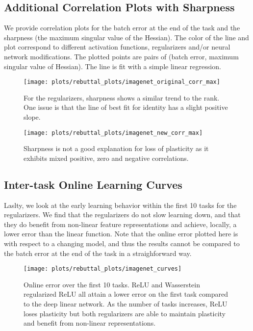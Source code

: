 \newpage
\subsection{Additional Correlation Plots with Sharpness}
We provide correlation plots for the batch error at the end of the task and the sharpness (the maximum singular value of the Hessian).
The color of the line and plot correspond to different activation functions, regularizers and/or neural network modifications.
The plotted points are pairs of (batch error, maximum singular value of Hessian).
The line is fit with a simple linear regression.

\begin{figure}[h!]
  \centering
  \texttt{[image: plots/rebuttal\_plots/imagenet\_original\_corr\_max]}
  \caption{
      For the regularizers, sharpness shows a similar trend to the rank. One issue is that the line of best fit for identity has a slight positive slope.
  }
  \label{fig:imagenet_og_max}
\end{figure}

\begin{figure}[h!]
  \centering
  \texttt{[image: plots/rebuttal\_plots/imagenet\_new\_corr\_max]}
  \caption{
      Sharpness is not a good explanation for loss of plasticity as it exhibits mixed positive, zero and negative correlations.
  }
  \label{fig:imagenet_new_max}
\end{figure}

\newpage

\subsection{Inter-task Online Learning Curves}
Laslty, we look at the early learning behavior within the first 10 tasks for the regularizers. We find that the regularizers do not slow learning down, and that they do benefit from non-linear feature representations and achieve, locally, a lower error than the linear function. Note that the online error plotted here is with respect to a changing model, and thus the results cannot be compared to the batch error at the end of the task in a straighforward way.


\begin{figure}[h!]
  \centering
  \texttt{[image: plots/rebuttal\_plots/imagenet\_curves]}
  \caption{
      Online error over the first 10 tasks. ReLU and Wasserstein regularized ReLU all attain a lower error on the first task compared to the deep linear network. As the number of tasks increases, ReLU loses plasticity but both regularizers are able to maintain plasticity and benefit from non-linear representations.
  }
  \label{fig:online_learning_curves}
\end{figure}

